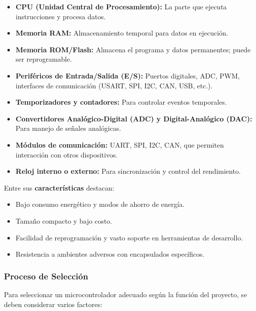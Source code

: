 \documentclass[a4paper,12pt]{article}
\begin{document}
	\begin{itemize}
		\item \textbf{CPU (Unidad Central de Procesamiento):} La parte que ejecuta instrucciones y procesa datos.
		\item \textbf{Memoria RAM:} Almacenamiento temporal para datos en ejecución.
		\item \textbf{Memoria ROM/Flash:} Almacena el programa y datos permanentes; puede ser reprogramable.
		\item \textbf{Periféricos de Entrada/Salida (E/S):} Puertos digitales, ADC, PWM, interfaces de comunicación (USART, SPI, I2C, CAN, USB, etc.).
		\item \textbf{Temporizadores y contadores:} Para controlar eventos temporales.
		\item \textbf{Convertidores Analógico-Digital (ADC) y Digital-Analógico (DAC):} Para manejo de señales analógicas.
		\item \textbf{Módulos de comunicación:} UART, SPI, I2C, CAN, que permiten interacción con otros dispositivos.
		\item \textbf{Reloj interno o externo:} Para sincronización y control del rendimiento.
	\end{itemize}
	
	Entre sus \textbf{características} destacan:
	
	\begin{itemize}
		\item Bajo consumo energético y modos de ahorro de energía.
		\item Tamaño compacto y bajo costo.
		\item Facilidad de reprogramación y vasto soporte en herramientas de desarrollo.
		\item Resistencia a ambientes adversos con encapsulados específicos.
	\end{itemize}
	
	\subsubsection{Proceso de Selección}
	Para seleccionar un microcontrolador adecuado según la función del proyecto, se deben considerar varios factores:
	
\end{document}
